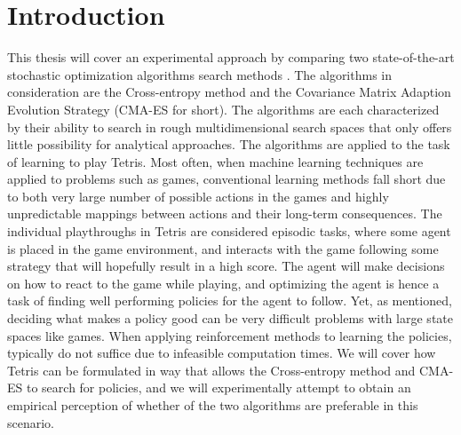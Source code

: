 \section{Introduction \label{sec:intro}}

This thesis will cover an experimental approach 
by comparing two state-of-the-art stochastic optimization algorithms search methods . 
The algorithms in consideration
are the Cross-entropy method and 
the Covariance Matrix Adaption Evolution Strategy (CMA-ES
for short). The algorithms are each characterized by their
ability to search in rough multidimensional 
search spaces that only offers little possibility 
for analytical approaches.
The algorithms are applied to the task of learning to play Tetris. 
Most often, when machine learning
techniques are applied to problems such as games, conventional
learning methods fall short due to both  very large number of 
possible actions in the games and highly unpredictable mappings 
between actions and their long-term consequences. The individual playthroughs
in Tetris are considered episodic tasks, where some agent is placed
in the game environment, and interacts with the game following some
strategy that will hopefully result in a high score. 
The agent will make decisions on how to react 
to the game while playing, and optimizing the agent is hence a task of
finding well performing policies for the agent to follow. Yet, as mentioned,
deciding what makes a policy good can be very difficult problems 
with large state spaces like games. When applying reinforcement methods to learning
the policies,  typically do not suffice 
due to infeasible computation times. We will cover how
Tetris can be formulated in way that allows  the Cross-entropy method 
and CMA-ES to search for policies, and we will experimentally 
attempt to obtain an empirical perception of whether of the two algorithms
are preferable in this scenario.










